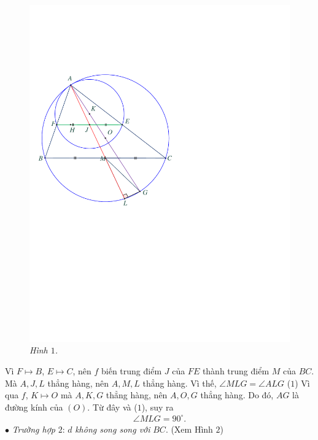 \begin{multicols}{2}
	\begin{figure}[H]
		\vspace*{-5pt}
		\centering
		\captionsetup{labelformat= empty, justification=centering}
		\includegraphics[width= 0.85\linewidth]{P591H1}
		\caption{\small\textit{\color{thachthuctoanhoc}Hình $1$.}}
		\vspace*{-10pt}
	\end{figure}
	Vì $F \mapsto B$, $E \mapsto C$, nên $f$ biến trung điểm $J$ của $FE$ thành trung điểm $M$ của $BC$. Mà $A, J, L$ thẳng hàng, nên $A, M, L$ thẳng hàng. Vì thế, $\angle MLG = \angle ALG$ \hfill ($1$)
	\vskip 0.05cm
	Vì qua $f$, $K \mapsto O$  mà $A, K, G$ thẳng hàng, nên $A, O, G$ thẳng hàng. Do đó, $AG$ là đường kính của $(O)$. Từ đây và ($1$), suy ra 
	\begin{align*}
		\angle MLG = 90^\circ.
	\end{align*}
	$\bullet$ \textit{Trường hợp} $2$: $d$ \textit{không song song với} $BC$. (Xem Hình $2$)
	\begin{figure}[H]
		\vspace*{-5pt}
		\centering
		\captionsetup{labelformat= empty, justification=centering}

\end{figure}
\end{multicols}
